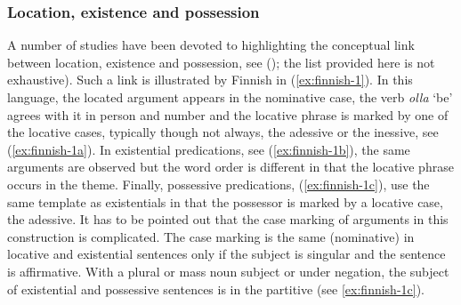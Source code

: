 \documentclass[output=paper,chinesefont,colorlinks,citecolor=brown]{langscibook}
\begin{document}
\subsubsection{Location, existence and possession}\label{sect:loc-ex-poss}\label{sec:intro:2.2.1}
A number of studies have been devoted to highlighting the conceptual link between location, existence and possession, see (\citealt{lyonsPossession1967,Clark1978,bickertonRootsLanguage1981,Heine1997,koutevaWorldLexiconGrammaticalization2019,Koch2012}); the list provided here is not exhaustive). Such a link is illustrated by Finnish in (\ref{ex:finnish-1}). In this language, the located argument appears in the nominative case, the verb \textit{olla} ‘be’ agrees with it in person and number and the locative phrase is marked by one of the locative cases, typically though not always, the adessive or the inessive, see (\ref{ex:finnish-1a}). In existential predications, see (\ref{ex:finnish-1b}), the same arguments are observed but the word order is different in that the locative phrase occurs in the theme. Finally, possessive predications, (\ref{ex:finnish-1c}), use the same template as existentials in that the possessor is marked by a locative case, the adessive. It has to be pointed out that the case marking of arguments in this construction is complicated. The case marking is the same (nominative) in locative and existential sentences only if the subject is singular and the sentence is affirmative. With a plural or mass noun subject or under negation, the subject of existential and possessive sentences is in the partitive (see \ref{ex:finnish-1c}).
\end{document}
